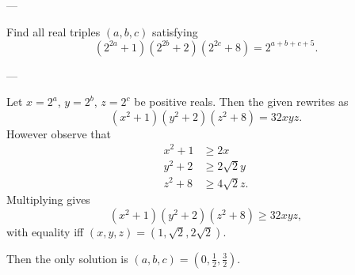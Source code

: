 
---

Find all real triples $(a,b,c)$ satisfying
\[(2^{2a}+1)(2^{2b}+2)(2^{2c}+8)=2^{a+b+c+5}.\]

---

Let $x=2^a$, $y=2^b$, $z=2^c$ be positive reals. Then the given rewrites as
\[(x^2+1)(y^2+2)(z^2+8)=32xyz.\]However observe that
\begin{align*}
    x^2+1&\ge2x\\
    y^2+2&\ge2\sqrt2y\\
    z^2+8&\ge4\sqrt2z.
\end{align*}Multiplying gives
\[(x^2+1)(y^2+2)(z^2+8)\ge32xyz,\]with equality iff $(x,y,z)=(1,\sqrt2,2\sqrt2)$.

Then the only solution is $(a,b,c)=(0,\tfrac12,\tfrac32)$.
